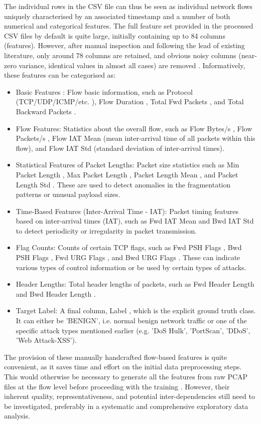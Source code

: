 The individual rows in the CSV file can thus be seen as individual network flows uniquely characterised by an associated timestamp and a number of both numerical and categorical features. The full feature set provided in the processed CSV files by default is quite large, initially containing up to 84 columns (features). However, after manual inspection and following the lead of existing literature, only around 78 columns are retained, and obvious noisy columns (near-zero variance, identical values in almost all cases) are removed \parencite {kumar2021cicids}. Informatively, these features can be categorised as: 
\begin{itemize}[noitemsep] 
\item Basic Features : Flow basic information, such as Protocol (TCP/UDP/ICMP/etc. ), Flow Duration , Total Fwd Packets , and Total Backward Packets .
\item Flow Features: Statistics about the overall flow, such as Flow Bytes/s , Flow Packets/s , Flow IAT Mean (mean inter-arrival time of all packets within this flow), and Flow IAT Std (standard deviation of inter-arrival times).
\item Statistical Features of Packet Lengths: Packet size statistics such as Min Packet Length , Max Packet Length , Packet Length Mean , and Packet Length Std . These are used to detect anomalies in the fragmentation patterns or unusual payload sizes.
\item Time-Based Features (Inter-Arrival Time - IAT): Packet timing features based on inter-arrival times (IAT), such as Fwd IAT Mean and Bwd IAT Std to detect periodicity or irregularity in packet transmission.
\item Flag Counts: Counts of certain TCP flags, such as Fwd PSH Flags , Bwd PSH Flags , Fwd URG Flags , and Bwd URG Flags . These can indicate various types of control information or be used by certain types of attacks.
\item Header Lengths: Total header lengths of packets, such as Fwd Header Length and Bwd Header Length .
\item Target Label: A final column, Label , which is the explicit ground truth class. It can either be 'BENIGN', i.e. normal benign network traffic or one of the specific attack types mentioned earlier (e.g. 'DoS Hulk', 'PortScan', 'DDoS', 'Web Attack-XSS'). 
\end{itemize} 
The provision of these manually handcrafted flow-based features is quite convenient, as it saves time and effort on the initial data preprocessing steps. This would otherwise be necessary to generate all the features from raw PCAP files at the flow level before proceeding with the training \parencite {shafi2022comprehensive}. However, their inherent quality, representativeness, and potential inter-dependencies still need to be investigated, preferably in a systematic and comprehensive exploratory data analysis.

